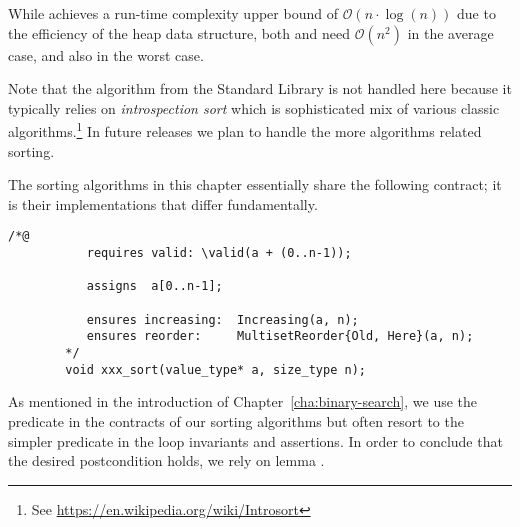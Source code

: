 While \heapsort achieves a run-time complexity upper bound of 
${\mathcal O}(n \cdot \log(n))$ due to the efficiency of the heap
data structure,
both \selectionsort and \insertionsort
need ${\mathcal O}(n^2)$ in the average case,
and also in the worst case.

Note that the  algorithm from the \cxx Standard Library
is not handled here because it typically relies on \emph{introspection sort}
which is sophisticated mix of various classic algorithms.\footnote{
  See \url{https://en.wikipedia.org/wiki/Introsort}
}
In future releases we plan to handle the more algorithms related sorting.

\clearpage

The sorting algorithms in this chapter essentially share the following contract;
it is their implementations that differ fundamentally.

\begin{lstlisting}[style = acsl-block]
        /*@
           requires valid: \valid(a + (0..n-1));

           assigns  a[0..n-1];

           ensures increasing:  Increasing(a, n);
           ensures reorder:     MultisetReorder{Old, Here}(a, n);
        */
        void xxx_sort(value_type* a, size_type n);
\end{lstlisting}

As mentioned in the introduction of Chapter~\ref{cha:binary-search},
we use the predicate  in the contracts of our
sorting algorithms but often resort to the simpler predicate
 in the loop invariants and assertions.
In order to conclude that the desired postcondition  holds,
we rely on lemma .










